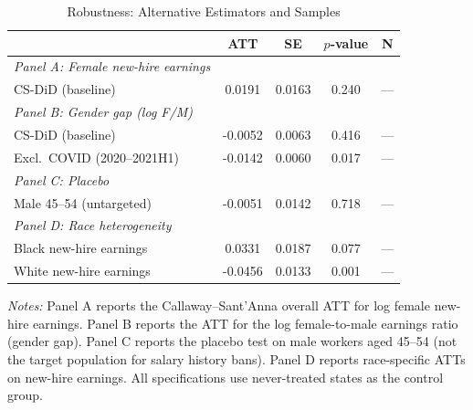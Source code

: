 \begin{table}[H]
\centering
\caption{Robustness: Alternative Estimators and Samples}
\label{tab:robust}
\begin{threeparttable}
\begin{tabular}{lcccc}
\toprule
 & ATT & SE & $p$-value & N \\
\midrule
\emph{Panel A: Female new-hire earnings} & & & & \\
CS-DiD (baseline) & 0.0191 & 0.0163 & 0.240 & --- \\
\addlinespace
\emph{Panel B: Gender gap (log F/M)} & & & & \\
CS-DiD (baseline) & -0.0052 & 0.0063 & 0.416 & --- \\
Excl.\ COVID (2020--2021H1) & -0.0142 & 0.0060 & 0.017 & --- \\
\addlinespace
\emph{Panel C: Placebo} & & & & \\
Male 45--54 (untargeted) & -0.0051 & 0.0142 & 0.718 & --- \\
\addlinespace
\emph{Panel D: Race heterogeneity} & & & & \\
Black new-hire earnings & 0.0331 & 0.0187 & 0.077 & --- \\
White new-hire earnings & -0.0456 & 0.0133 & 0.001 & --- \\
\bottomrule
\end{tabular}
\begin{tablenotes}[flushleft]
\small
\item \emph{Notes:} Panel A reports the Callaway--Sant'Anna overall ATT for log female new-hire earnings. Panel B reports the ATT for the log female-to-male earnings ratio (gender gap). Panel C reports the placebo test on male workers aged 45--54 (not the target population for salary history bans). Panel D reports race-specific ATTs on new-hire earnings. All specifications use never-treated states as the control group.
\end{tablenotes}
\end{threeparttable}
\end{table}
